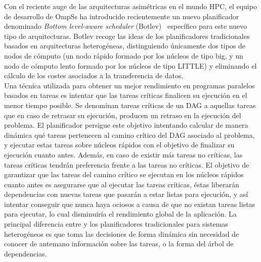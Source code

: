 
Con el reciente auge de las arquitecturas asimétricas en el mundo HPC, el
equipo de desarrollo de OmpSs ha introducido recientemente un nuevo
planificador denominado \emph{Bottom level-aware scheduler}
(Botlev)~\cite{botlev} específico para este nuevo tipo de
arquitecturas. Botlev recoge las ideas de los planificadores tradicionales
basados en arquitecturas heterogéneas, distinguiendo únicamente dos tipos
de nodos de cómputo (un nodo rápido formado por los núcleos de tipo big, y un
nodo de cómputo lento formado por los núcleos de tipo LITTLE) y eliminando el
cálculo de los costes asociados a
la transferencia de datos. \\

Una técnica utilizada para obtener un mejor rendimiento en programas
paralelos basados en tareas es intentar que las tareas críticas finalicen
su ejecución en el menor tiempo posible. Se denominan tareas críticas de un
DAG a aquellas tareas que en caso de retrasar su ejecución, producen un
retraso en la ejecución del problema. El planificador \botlev persigue este
objetivo intentando calcular de manera dinámica qué tareas pertenecen al
camino crítico del DAG asociado al problema, y ejecutar estas tareas sobre
núcleos rápidos con el objetivo de finalizar su ejecución cuanto
antes. Además, en caso de existir más tareas no críticas, las tareas
críticas tendrán preferencia frente a las tareas no críticas. El objetivo
de garantizar que las tareas del camino crítico se ejecutan en los núcleos
rápidos cuanto antes es asegurarse que al ejecutar las tareas críticas,
éstas liberarán dependencias con nuevas tareas que pasarán a estar listas
para ejecución, y así intentar conseguir que nunca haya \wts ociosos a
causa de que no existan tareas listas para ejecutar, lo cual disminuiría el
rendimiento global de la aplicación. La principal diferencia entre \botlev
y los planificadores tradicionales para sistemas heterogéneos es que
\botlev toma las decisiones de forma dinámica sin necesidad de conocer de
antemano información sobre las tareas, o la forma del árbol de
dependencias.

